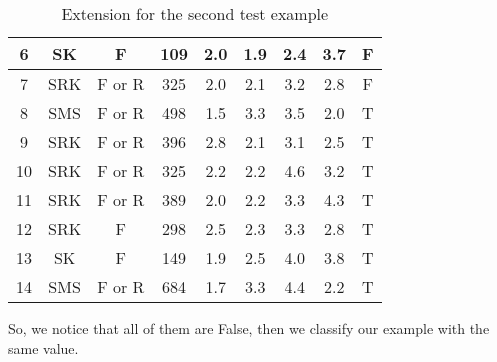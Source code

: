 \documentclass[12pt]{report}
\begin{document}
\begin{solution}
\begin{enumerate}
\begin{itemize}
\begin{table}[H]
\begin{tabular}{|c|c|c|c|c|c|c|c|c|}
                6 &
                  SK &
                  F &
                  109 &
                  2.0 &
                  1.9 &
                  2.4 &
                  \cellcolor[HTML]{FE0000}3.7 &
                  F \\ \hline
                7 &
                  \cellcolor[HTML]{FE0000}SRK &
                  F or R &
                  325 &
                  2.0 &
                  2.1 &
                  3.2 &
                  2.8 &
                  F \\ \hline
                8 &
                  \cellcolor[HTML]{FE0000}SMS &
                  F or R &
                  498 &
                  1.5 &
                  3.3 &
                  3.5 &
                  2.0 &
                  T \\ \hline
                9 &
                  \cellcolor[HTML]{FE0000}SRK &
                  F or R &
                  396 &
                  2.8 &
                  2.1 &
                  3.1 &
                  2.5 &
                  T \\ \hline
                10 &
                  \cellcolor[HTML]{FE0000}SRK &
                  F or R &
                  325 &
                  2.2 &
                  2.2 &
                  4.6 &
                  3.2 &
                  T \\ \hline
                11 &
                  \cellcolor[HTML]{FE0000}SRK &
                  F or R &
                  389 &
                  2.0 &
                  2.2 &
                  3.3 &
                  4.3 &
                  T \\ \hline
                12 &
                  \cellcolor[HTML]{FE0000}SRK &
                  F &
                  298 &
                  2.5 &
                  2.3 &
                  3.3 &
                  2.8 &
                  T \\ \hline
                13 &
                  SK &
                  F &
                  149 &
                  1.9 &
                  \cellcolor[HTML]{FFFFFF}2.5 &
                  \cellcolor[HTML]{FE0000}4.0 &
                  3.8 &
                  T \\ \hline
                14 &
                  \cellcolor[HTML]{FE0000}SMS &
                  F or R &
                  684 &
                  1.7 &
                  3.3 &
                  4.4 &
                  2.2 &
                  T \\ \hline
                \end{tabular}
                \caption{Extension for the second test example}
                \label{table:ext2}
                \end{table}
                So, we notice that all of them are False, then we classify our example with the same value.
        \end{itemize}

\end{enumerate}
\end{solution}
\end{document}
